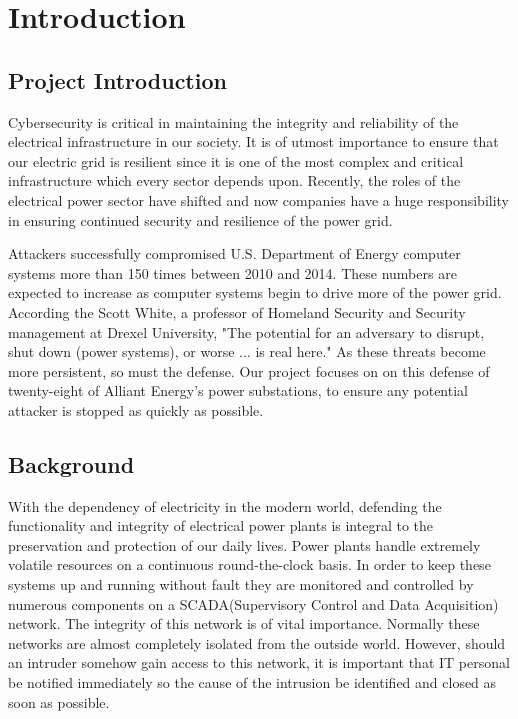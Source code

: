 \chapter{Introduction}

\section{Project Introduction}

Cybersecurity is critical in maintaining the integrity and reliability of the electrical infrastructure in our society. It is of utmost importance to ensure that our electric grid is resilient since it is one of the most complex and critical infrastructure which every sector depends upon. Recently, the roles of the electrical power sector have shifted and now companies have a huge responsibility in ensuring continued security and resilience of the power grid. 

Attackers successfully compromised U.S. Department of Energy computer systems more than 150 times between 2010 and 2014. These numbers are expected to increase as computer systems begin to drive more of the power grid. According the Scott White, a professor of Homeland Security and Security management at Drexel University, "The potential for an adversary to disrupt, shut down (power systems), or worse ... is real here." As these threats become more persistent, so must the defense. Our project focuses on on this defense of twenty-eight of Alliant Energy's power substations, to ensure any potential attacker is stopped as quickly as possible. 

\section{Background}
With the dependency of electricity in the modern world, defending the functionality and integrity of electrical power plants is integral to the preservation and protection of our daily lives. Power plants handle extremely volatile resources on a continuous round-the-clock basis. In order to keep these systems up and running without fault they are monitored and controlled by numerous components on a SCADA(Supervisory Control and Data Acquisition) network. The integrity of this network is of vital importance. Normally these networks are almost completely isolated from the outside world. However, should an intruder somehow gain access to this network, it is important that IT personal be notified immediately so the cause of the intrusion be identified and closed as soon as possible.

